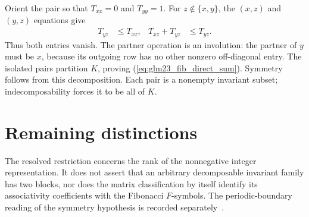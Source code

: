 \documentclass{article}
\begin{document}
Orient the pair so that $T_{xx}=0$ and $T_{yy}=1$. For $z\notin\{x,y\}$,
the $(x,z)$ and $(y,z)$ equations give
\begin{align}
    T_{yz} & \leq T_{xz}, & T_{xz}+T_{yz} & \leq T_{yz}.
    \label{eq:glm23_fib_isolation}
\end{align}
Thus both entries vanish. The partner operation is an involution: the
partner of $y$ must be $x$, because its outgoing row has no other
nonzero off-diagonal entry. The isolated pairs partition $K$, proving
(\ref{eq:glm23_fib_direct_sum}). Symmetry follows from this decomposition.
Each pair is a nonempty invariant subset; indecomposability forces it to be
all of $K$.

\section{Remaining distinctions}
The resolved restriction concerns the rank of the nonnegative integer
representation. It does not assert that an arbitrary decomposable invariant
family has two blocks, nor does the matrix classification by itself identify
its associativity coefficients with the Fibonacci $F$-symbols. The
periodic-boundary reading of the symmetry hypothesis is recorded
separately~\cite{gap:glm23_mpo_symmetric_mps_scope}.



\end{document}
